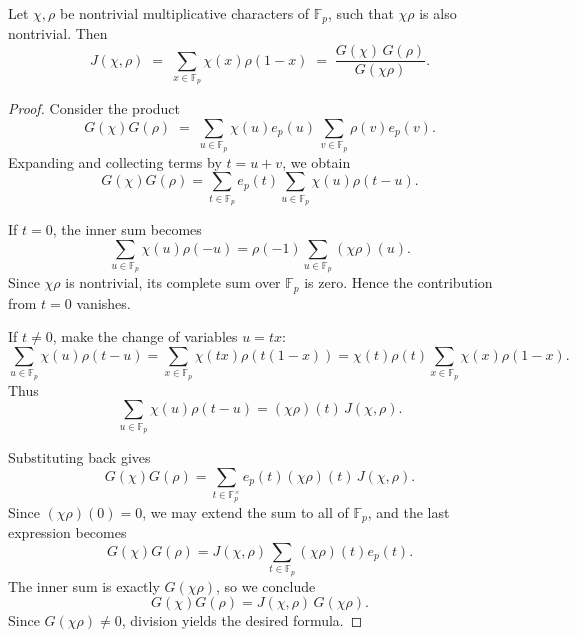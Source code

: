 \documentclass[10pt,a4paper]{amsart}
\begin{document}
\begin{lemma}
Let $\chi,\rho$ be nontrivial multiplicative characters of $\mathbb{F}_p$, such that
$\chi\rho$ is also nontrivial. Then
\[
J(\chi,\rho) \;=\; \sum_{x\in\mathbb{F}_p}\chi(x)\rho(1-x)
\;=\; \frac{G(\chi)\,G(\rho)}{G(\chi\rho)}.
\]
\end{lemma}

\begin{proof}
Consider the product
\[
G(\chi)G(\rho) \;=\; 
\sum_{u\in\mathbb{F}_p} \chi(u)e_p(u)\,
\sum_{v\in\mathbb{F}_p} \rho(v)e_p(v).
\]
Expanding and collecting terms by $t=u+v$, we obtain
\[
G(\chi)G(\rho) 
= \sum_{t\in\mathbb{F}_p} e_p(t) \sum_{u\in\mathbb{F}_p} \chi(u)\rho(t-u).
\]

If $t=0$, the inner sum becomes
\[
\sum_{u\in\mathbb{F}_p}\chi(u)\rho(-u) = \rho(-1)\sum_{u\in\mathbb{F}_p} (\chi\rho)(u).
\]
Since $\chi\rho$ is nontrivial, its complete sum over $\mathbb{F}_p$ is zero.
Hence the contribution from $t=0$ vanishes.

If $t\neq 0$, make the change of variables $u=tx$:
\[
\sum_{u\in\mathbb{F}_p}\chi(u)\rho(t-u)
= \sum_{x\in\mathbb{F}_p}\chi(tx)\rho(t(1-x))
= \chi(t)\rho(t)\sum_{x\in\mathbb{F}_p}\chi(x)\rho(1-x).
\]
Thus
\[
\sum_{u\in\mathbb{F}_p}\chi(u)\rho(t-u) = (\chi\rho)(t)\,J(\chi,\rho).
\]

Substituting back gives
\[
G(\chi)G(\rho) 
= \sum_{t\in\mathbb{F}_p^\times} e_p(t)(\chi\rho)(t)\,J(\chi,\rho).
\]
Since $(\chi\rho)(0)=0$, we may extend the sum to all of $\mathbb{F}_p$,
and the last expression becomes
\[
G(\chi)G(\rho) = J(\chi,\rho)\sum_{t\in\mathbb{F}_p} (\chi\rho)(t)e_p(t).
\]
The inner sum is exactly $G(\chi\rho)$, so we conclude
\[
G(\chi)G(\rho) = J(\chi,\rho)\,G(\chi\rho).
\]
Since $G(\chi\rho)\neq 0$, division yields the desired formula.
\end{proof}
\end{document}
